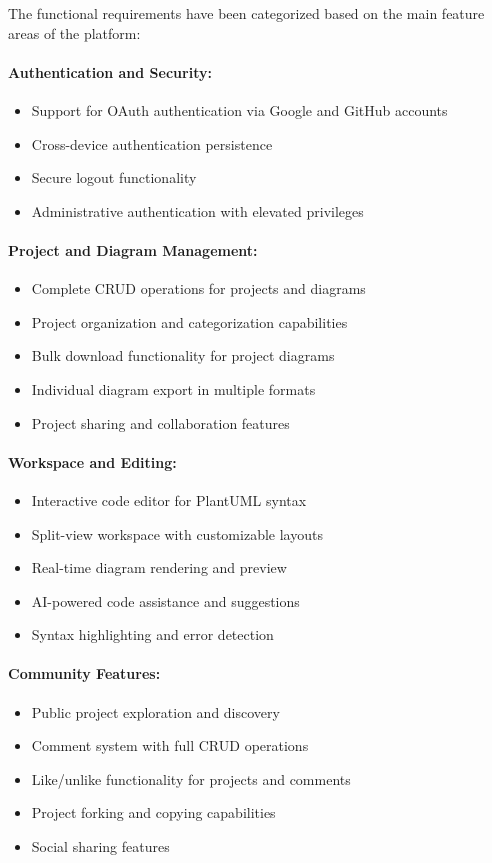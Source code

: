 The functional requirements have been categorized based on the main feature areas of the platform:

\paragraph{Authentication and Security:}
\begin{itemize}
    \item Support for OAuth authentication via Google and GitHub accounts
    \item Cross-device authentication persistence
    \item Secure logout functionality
    \item Administrative authentication with elevated privileges
\end{itemize}

\paragraph{Project and Diagram Management:}
\begin{itemize}
    \item Complete CRUD operations for projects and diagrams
    \item Project organization and categorization capabilities
    \item Bulk download functionality for project diagrams
    \item Individual diagram export in multiple formats
    \item Project sharing and collaboration features
\end{itemize}

\paragraph{Workspace and Editing:}
\begin{itemize}
    \item Interactive code editor for PlantUML syntax
    \item Split-view workspace with customizable layouts
    \item Real-time diagram rendering and preview
    \item AI-powered code assistance and suggestions
    \item Syntax highlighting and error detection
\end{itemize}

\paragraph{Community Features:}
\begin{itemize}
    \item Public project exploration and discovery
    \item Comment system with full CRUD operations
    \item Like/unlike functionality for projects and comments
    \item Project forking and copying capabilities
    \item Social sharing features
\end{itemize}

